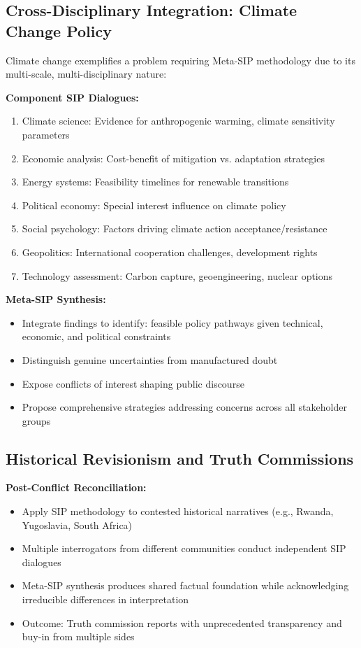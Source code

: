 \documentclass[11pt,a4paper]{article}
\begin{document}
\subsection{Cross-Disciplinary Integration: Climate Change Policy}

Climate change exemplifies a problem requiring Meta-SIP methodology due to its multi-scale, multi-disciplinary nature:

\textbf{Component SIP Dialogues:}
\begin{enumerate}[nosep]
    \item Climate science: Evidence for anthropogenic warming, climate sensitivity parameters
    \item Economic analysis: Cost-benefit of mitigation vs. adaptation strategies
    \item Energy systems: Feasibility timelines for renewable transitions
    \item Political economy: Special interest influence on climate policy
    \item Social psychology: Factors driving climate action acceptance/resistance
    \item Geopolitics: International cooperation challenges, development rights
    \item Technology assessment: Carbon capture, geoengineering, nuclear options
\end{enumerate}

\textbf{Meta-SIP Synthesis:}
\begin{itemize}[nosep]
    \item Integrate findings to identify: feasible policy pathways given technical, economic, and political constraints
    \item Distinguish genuine uncertainties from manufactured doubt
    \item Expose conflicts of interest shaping public discourse
    \item Propose comprehensive strategies addressing concerns across all stakeholder groups
\end{itemize}

\subsection{Historical Revisionism and Truth Commissions}

\textbf{Post-Conflict Reconciliation:}
\begin{itemize}[nosep]
    \item Apply SIP methodology to contested historical narratives (e.g., Rwanda, Yugoslavia, South Africa)
    \item Multiple interrogators from different communities conduct independent SIP dialogues
    \item Meta-SIP synthesis produces shared factual foundation while acknowledging irreducible differences in interpretation
    \item Outcome: Truth commission reports with unprecedented transparency and buy-in from multiple sides
\end{itemize}
\end{document}
